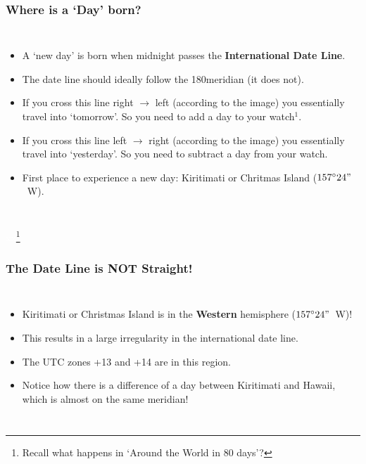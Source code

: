 \def\fn{\tiny Recall what happens in `Around the World in 80 days'?}
\begin{frame}
\frametitle{Where is a `Day' born?}
\begin{columns}
\begin{itemize}
\item A `new day' is born when midnight passes the \textbf{International Date Line}.
\item The date line should ideally follow the 180\degree meridian (it does not). 
\item If you cross this line right $\rightarrow$ left (according to the image) you essentially travel into `tomorrow'. So you need to add a day to your watch$^\text{1}$.
\item If you cross this line left $\rightarrow$ right (according to the image) you essentially travel into `yesterday'. So you need to subtract a day from your watch.
\item First place to experience a new day: Kiritimati or Chritmas Island ($157^\circ24"$~\textcolor{myRed}{W}).
\end{itemize}
\end{columns}
\textcolor{white}{xx\footnote{\fn}}
\end{frame}

\begin{frame}
\frametitle{The Date Line is NOT Straight!}
\begin{columns}
\begin{itemize}\small
\item Kiritimati or Christmas Island is in the \textbf{Western} hemisphere ($157^\circ24"$~\textcolor{myRed}{W})!
\item This results in a large irregularity in the international date line.
\item The UTC zones +13 and +14 are in this region.
\item Notice how there is a difference of a day between Kiritimati and Hawaii, which is almost on the same meridian!
\end{itemize}
\end{columns}
\end{frame}

